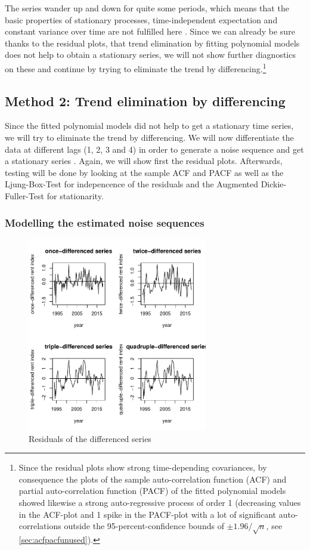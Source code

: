 \documentclass[11pt,a4paper]{article}
\begin{document}
The series wander up and down for quite some periods, which means that the basic properties of stationary processes, time-independent expectation and constant variance over time are not fulfilled here \cite[p.~49]{bd02}.
Since we can already be sure thanks to the residual plots, that trend elimination by fitting polynomial models does not help to obtain a stationary series, we will not show further diagnostics on these and continue by trying to eliminate the trend by differencing.\footnote{
    Since the residual plots show strong time-depending covariances, by consequence the plots of the sample auto-correlation function (ACF) and partial auto-correlation function (PACF) of the fitted polynomial models showed likewise a strong auto-regressive process of order 1 (decreasing values in the ACF-plot and 1 spike in the PACF-plot with a lot of significant auto-correlations outside the 95-percent-confidence bounds of $\pm 1.96/\sqrt{n}$, see \cref{sec:acfpacfunused}).
}


\subsection{Method 2: Trend elimination by differencing}
Since the fitted polynomial models did not help to get a stationary time series, we will try to eliminate the trend by differencing.
We will now differentiate the data at different lags (1, 2, 3 and 4) in order to generate a noise sequence and get a stationary series \citep[p.~35]{bd02}.
Again, we will show first the residual plots.
Afterwards, testing will be done by looking at the sample ACF and PACF as well as the Ljung-Box-Test for indepencence of the residuals and the Augmented Dickie-Fuller-Test for stationarity.


\subsubsection{Modelling the estimated noise sequences}

\begin{figure}
    \centering
    \includegraphics[width=0.7\textwidth]{resid_diff_all}
    \caption{Residuals of the differenced series}
    \label{fig:resid_diff_all}
\end{figure}
\end{document}
